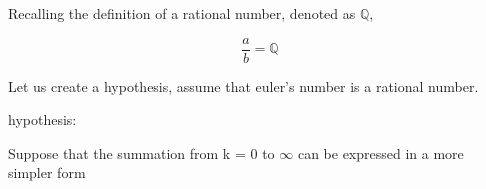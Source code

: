 \documentclass[12pt, a4paper]{article}
\begin{document}
\vspace{0.5cm}



Recalling the definition of a rational number, denoted as $\mathbb{Q}$,

\vspace{0.5cm}
{\fontsize{17.28}{18pt}\selectfont
\[
\frac{a}{b} = \mathbb{Q}
\]
}
\raggedright%

Let us create a hypothesis, assume that euler's number is a rational number.
\newline

hypothesis: \centering {\fontsize{17.28}{18pt}\selectfont
\[e \in \mathbb{Q}
\]
}

\raggedright%

Suppose that the summation from k = 0 to $\infty$ can be expressed in a more simpler form

\centering{\fontsize{17.28pt}{18pt}\selectfont
\[ \sum_{k=0}^\infty \frac{1}{k!} = \frac{1}{0!} + \frac{1}{1!} + \frac{1}{2!} ... + \frac{1}{k!} = \frac{a}{b}
\]
}

\centering{\fontsize{17.28pt}{18pt}\selectfont
\[ e = \frac{a}{b}
\]
}
\vspace{0.5cm}
\end{document}
